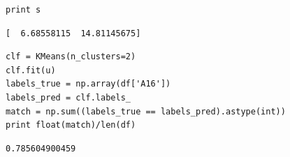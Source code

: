 \documentclass[12pt,fleqn]{article}\usepackage{../common}
\begin{document}
\begin{verbatim}
print s
\end{verbatim}

\begin{verbatim}
[  6.68558115  14.81145675]
\end{verbatim}

\begin{verbatim}
clf = KMeans(n_clusters=2)
clf.fit(u)
labels_true = np.array(df['A16'])
labels_pred = clf.labels_
match = np.sum((labels_true == labels_pred).astype(int))
print float(match)/len(df)
\end{verbatim}

\begin{verbatim}
0.785604900459
\end{verbatim}
\end{document}
